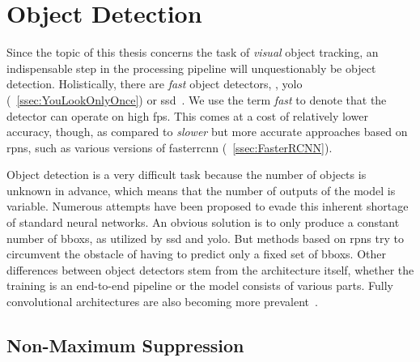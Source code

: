 \section{Object Detection}
\label{sec:ObjectDetection}

Since the topic of this thesis concerns the task of \emph{visual} object tracking, an indispensable step in the processing pipeline will unquestionably be object detection. Holistically, there are \emph{fast} object detectors, \egtext{}, \gls{yolo}~\cite{redmon2016yolo} (\sectiontext{}~\ref{ssec:YouLookOnlyOnce}) or \gls{ssd}~\cite{liu2016ssd}. We use the term \emph{fast} to denote that the detector can operate on high \gls{fps}. This comes at a cost of relatively lower accuracy, though, as compared to \emph{slower} but more accurate approaches based on \glspl{rpn}, such as various versions of \gls{fasterrcnn} (\sectiontext{}~\ref{ssec:FasterRCNN}).

Object detection is a very difficult task because the number of objects is unknown in advance, which means that the number of outputs of the model is variable. Numerous attempts have been proposed to evade this inherent shortage of standard neural networks. An obvious solution is to only produce a constant number of \glspl{bbox}, as utilized by \gls{ssd} and \gls{yolo}. But methods based on \glspl{rpn} try to circumvent the obstacle of having to predict only a fixed set of \glspl{bbox}. Other differences between object detectors stem from the architecture itself, whether the training is an end-to-end pipeline or the model consists of various parts. Fully convolutional architectures are also becoming more prevalent~\cite{tian2019fcos}.

\subsection{Non-Maximum Suppression}
\label{ssec:NonMaximumSuppression}

